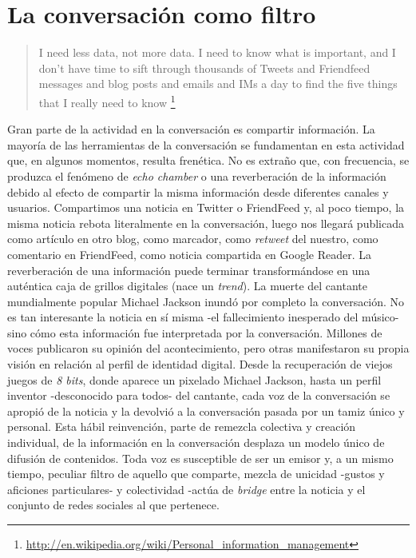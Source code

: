 \documentclass[12pt, a4paper,twoside]{book}
\begin{document}
\section{La conversación como filtro}

\begin{quote}
I need less data, not more data. I need to know what is important,
and I don't have time to sift through thousands of Tweets and
Friendfeed messages and blog posts and emails and IMs a day to find
the five things that I really need to know%
\footnote{\href{http://en.wikipedia.org/wiki/Personal_information_management}{http://en.wikipedia.org/wiki/Personal\_information\_management}}

\end{quote}
Gran parte de la actividad en la conversación es compartir
información. La mayoría de las herramientas de la conversación se
fundamentan en esta actividad que, en algunos momentos, resulta
frenética. No es extraño que, con frecuencia, se produzca el
fenómeno de \emph{echo chamber} o una reverberación de la
información debido al efecto de compartir la misma información
desde diferentes canales y usuarios. Compartimos una noticia en
Twitter o FriendFeed y, al poco tiempo, la misma noticia rebota
literalmente en la conversación, luego nos llegará publicada como
artículo en otro blog, como marcador, como \emph{retweet} del
nuestro, como comentario en FriendFeed, como noticia compartida en
Google Reader. La reverberación de una información puede terminar
transformándose en una auténtica caja de grillos digitales (nace un
\emph{trend}). La muerte del cantante mundialmente popular Michael
Jackson inundó por completo la conversación. No es tan interesante
la noticia en sí misma -el fallecimiento inesperado del músico-
sino cómo esta información fue interpretada por la conversación.
Millones de voces publicaron su opinión del acontecimiento, pero
otras manifestaron su propia visión en relación al perfil de
identidad digital. Desde la recuperación de viejos juegos de
\emph{8 bits}, donde aparece un pixelado Michael Jackson, hasta un
perfil inventor -desconocido para todos- del cantante, cada voz de
la conversación se apropió de la noticia y la devolvió a la
conversación pasada por un tamiz único y personal. Esta hábil
reinvención, parte de remezcla colectiva y creación individual, de
la información en la conversación desplaza un modelo único de
difusión de contenidos. Toda voz es susceptible de ser un emisor y,
a un mismo tiempo, peculiar filtro de aquello que comparte, mezcla
de unicidad -gustos y aficiones particulares- y colectividad -actúa
de \emph{bridge} entre la noticia y el conjunto de redes sociales
al que pertenece.
\end{document}
